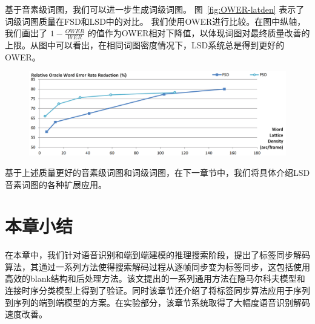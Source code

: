 基于音素级词图，我们可以进一步生成词级词图。 图~\ref{fig:OWER-latden} 表示了词级词图质量在FSD和LSD中的对比。
我们使用OWER进行比较。在图中纵轴，我们画出了 $1-\frac{OWER}{WER}$ 的值作为OWER相对下降值，以体现词图对最终质量改善的上限。从图中可以看出，在相同词图密度情况下，LSD系统总是得到更好的OWER。


\begin{figure}[!htp]
  \centering
    \captionstyle{\centering}
    \includegraphics[width=\textwidth]{figure/OWER-latden.png}
\end{figure}

基于上述质量更好的音素级词图和词级词图，在下一章节中，我们将具体介绍LSD音素词图的各种扩展应用。

\section{本章小结}
\label{chap:lsd-sum}

在本章中，我们针对语音识别和端到端建模的推理搜索阶段，提出了标签同步解码算法，其通过一系列方法使得搜索解码过程从逐帧同步变为标签同步，这包括使用高效的blank结构和后处理方法。该文提出的一系列通用方法在隐马尔科夫模型和连接时序分类模型上得到了验证。同时该章节还介绍了将标签同步算法应用于序列到序列的端到端模型的方案。在实验部分，该章节系统取得了大幅度语音识别解码速度改善。
